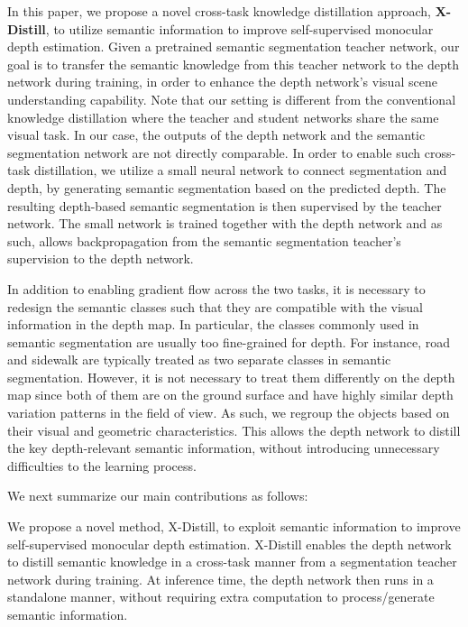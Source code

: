 \documentclass{bmvc2k}
\begin{document}
In this paper, we propose a novel cross-task knowledge distillation approach, \textbf{X-Distill}, to utilize semantic information to improve self-supervised monocular depth estimation. Given a pretrained semantic segmentation teacher network, our goal is to transfer the semantic knowledge from this teacher network to the depth network during training, in order to enhance the depth network's visual scene understanding capability. Note that our setting is different from the conventional knowledge distillation where the teacher and student networks share the same visual task. In our case, the outputs of the depth network and the semantic segmentation network are not directly comparable. In order to enable such cross-task distillation, we utilize a small neural network to connect segmentation and depth, by generating semantic segmentation based on the predicted depth. The resulting depth-based semantic segmentation is then supervised by the teacher network. The small network is trained together with the depth network and as such, allows backpropagation from the semantic segmentation teacher's supervision to the depth network.

In addition to enabling gradient flow across the two tasks, it is necessary to redesign the semantic classes such that they are compatible with the visual information in the depth map. In particular, the classes commonly used in semantic segmentation are usually too fine-grained for depth. For instance, road and sidewalk are typically treated as two separate classes in semantic segmentation. However, it is not necessary to treat them differently on the depth map since both of them are on the ground surface and have highly similar depth variation patterns in the field of view. As such, we regroup the objects based on their visual and geometric characteristics. This allows the depth network to distill the key depth-relevant semantic information, without introducing unnecessary difficulties to the learning process. 

We next summarize our main contributions as follows:

\hangindent=24pt 
\textbullet \hspace{2pt} We propose a novel method, X-Distill, to exploit semantic information to improve self-supervised monocular depth estimation. X-Distill enables the depth network to distill semantic knowledge in a cross-task manner from a segmentation teacher network during training. At inference time, the depth network then runs in a standalone manner, without requiring extra computation to process/generate semantic information.
\end{document}
